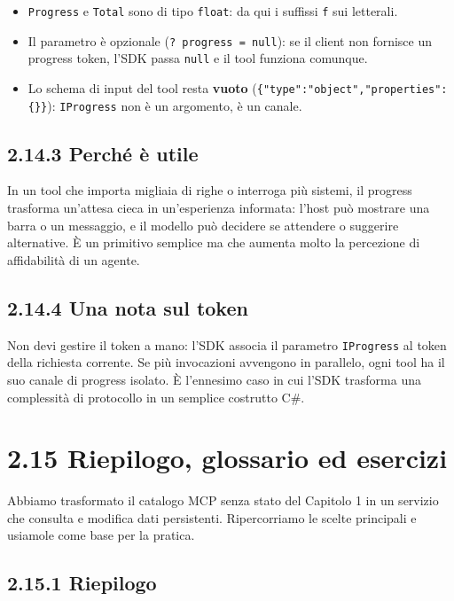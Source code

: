 \documentclass[
  italian,
  10pt,
]{book}
\providecommand{\tightlist}{%
  \setlength{\itemsep}{0pt}\setlength{\parskip}{0pt}}
\begin{document}
\begin{itemize}
\tightlist
\item
  \texttt{Progress} e \texttt{Total} sono di tipo \texttt{float}: da qui
  i suffissi \texttt{f} sui letterali.
\item
  Il parametro è opzionale (\texttt{?\ progress\ =\ null}): se il client
  non fornisce un progress token, l'SDK passa \texttt{null} e il tool
  funziona comunque.
\item
  Lo schema di input del tool resta \textbf{vuoto}
  (\texttt{\{"type":"object","properties":\{\}\}}): \texttt{IProgress}
  non è un argomento, è un canale.
\end{itemize}

\subsection{2.14.3 Perché è utile}\label{perchuxe9-uxe8-utile}

In un tool che importa migliaia di righe o interroga più sistemi, il
progress trasforma un'attesa cieca in un'esperienza informata: l'host
può mostrare una barra o un messaggio, e il modello può decidere se
attendere o suggerire alternative. È un primitivo semplice ma che
aumenta molto la percezione di affidabilità di un agente.

\subsection{2.14.4 Una nota sul token}\label{una-nota-sul-token}

Non devi gestire il token a mano: l'SDK associa il parametro
\texttt{IProgress} al token della richiesta corrente. Se più invocazioni
avvengono in parallelo, ogni tool ha il suo canale di progress isolato.
È l'ennesimo caso in cui l'SDK trasforma una complessità di protocollo
in un semplice costrutto C\#.

\section{2.15 Riepilogo, glossario ed
esercizi}\label{riepilogo-glossario-ed-esercizi-1}

Abbiamo trasformato il catalogo MCP senza stato del Capitolo 1 in un
servizio che consulta e modifica dati persistenti. Ripercorriamo le
scelte principali e usiamole come base per la pratica.

\subsection{2.15.1 Riepilogo}\label{riepilogo-1}
\end{document}
